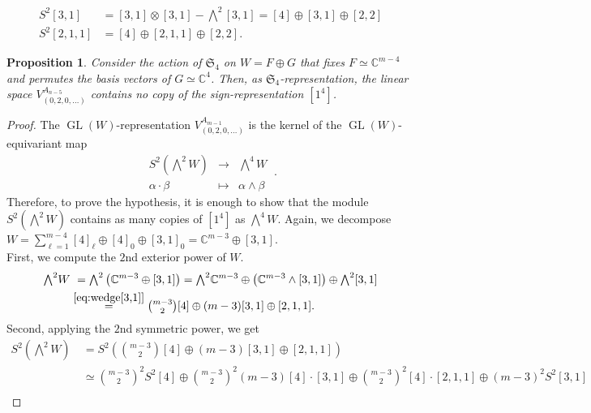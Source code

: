 \documentclass[10pt,a4paper]{amsart}
\newtheorem{proposition}{Proposition}
\DeclareMathOperator{\GL}{GL}
\begin{document}
\begin{align}\label{eq:sym[3,1]}
S^2[3,1] & = [3,1]\otimes [3,1] - {\textstyle \bigwedge^2}[3,1] = [4] \oplus [3,1] \oplus [2,2] \nonumber \\
S^2[2,1,1] & = [4] \oplus [2,1,1] \oplus [2,2] .
\end{align}

\begin{proposition}\label{prop:sign-rep in sym2wedge2}
Consider the action of $\mathfrak{S}_4$ on $W = F \oplus G$ that fixes $F\simeq \mathbb C^{m-4}$ and permutes the basis vectors of $G\simeq \mathbb C^4$. Then, as $\mathfrak{S}_4$-representation, the linear space $V_{(0,2,0,\ldots)}^{A_{n-5}}$ contains no copy of the sign-representation $[1^4]$.
\end{proposition}

\begin{proof}
The $\GL(W)$-representation $V_{(0,2,0,\ldots)}^{A_{m-1}}$ is the kernel of the $\GL(W)$-equivariant map  
\[ \begin{matrix}
S^2(\textstyle{\bigwedge^2W}) & \rightarrow & \textstyle{\bigwedge^4W} \\
\alpha\cdot \beta & \mapsto & \alpha \wedge \beta
\end{matrix} \ .\] 
Therefore, to prove the hypothesis, it is enough to show that the module $S^2(\bigwedge^2W)$ contains as many copies of $[1^4]$ as $\bigwedge^4W$. Again, we decompose $W=\sum_{\ell=1}^{m-4}[4]_\ell \oplus [4]_0 \oplus [3,1]_0= \mathbb C^{m-3}\oplus [3,1]$. \\
First, we compute the $2$nd exterior power of $W$.
\begin{align*}
{\textstyle \bigwedge^2}W & \  = {\textstyle \bigwedge^2}\left( \mathbb C^{m-3} \oplus [3,1]\right)  = {\textstyle \bigwedge^2}\mathbb C^{m-3} \oplus \left(\mathbb C^{m-3}\wedge [3,1] \right) \oplus {\textstyle \bigwedge^2}[3,1] \\
& \stackrel{\eqref{eq:wedge[3,1]}}{=} {\textstyle \binom{m-3}{2}}[4] \oplus (m-3)[3,1] \oplus [2,1,1] .
\end{align*}
Second, applying the $2$nd symmetric power, we get
\begin{align*}
S^2({\textstyle \bigwedge^2}W) & \ = S^2\left( {\textstyle \binom{m-3}{2}}[4] \oplus (m-3)[3,1] \oplus [2,1,1] \right) \\
& \ \simeq {\textstyle \binom{m-3}{2}^2}S^2[4] \oplus {\textstyle \binom{m-3}{2}^2}(m-3)[4]\cdot [3,1] \oplus {\textstyle \binom{m-3}{2}^2}[4]\cdot [2,1,1] \oplus  (m-3)^2 S^2[3,1] \\

\end{align*}
\end{proof}
\end{document}
